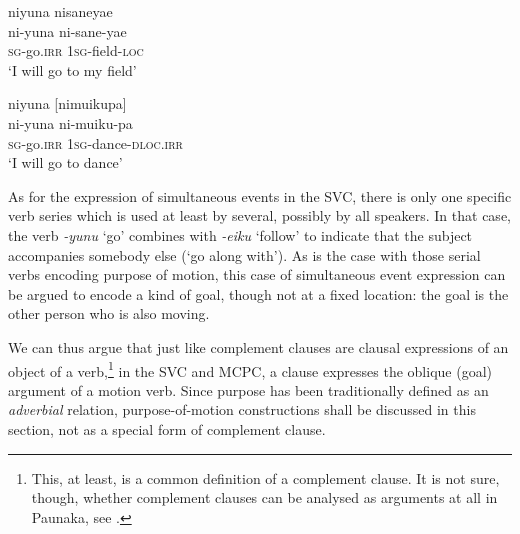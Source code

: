 \ea\label{ex:go-field}
\begingl
\glpreamble niyuna nisaneyae\\
\gla ni-yuna ni-sane-yae\\
\textsc{sg}-go.\textsc{irr} 1\textsc{sg}-field-\textsc{loc}\\
\glft ‘I will go to my field’
\endgl
\trailingcitation{[jxx-n101013s-1.652]}
\xe

\ea\label{ex:go-dance}
\begingl
\glpreamble niyuna \textup{[}nimuikupa\textup{]}\\
\gla ni-yuna ni-muiku-pa\\
\textsc{sg}-go.\textsc{irr} 1\textsc{sg}-dance-\textsc{dloc.irr}\\
\glft ‘I will go to dance’
\endgl
\trailingcitation{[rxx-e181022le]}
\xe


As for the expression of simultaneous events in the SVC, there is only one specific verb series which is used at least by several, possibly by all speakers. In that case, the verb \textit{-yunu} ‘go’ combines with \textit{-eiku} ‘follow’ to indicate that the subject accompanies somebody else (‘go along with’). As is the case with those serial verbs encoding purpose of motion, this case of simultaneous event expression can be argued to encode a kind of goal, though not at a fixed location: the goal is the other person who is also moving.

We can thus argue that just like complement clauses are clausal expressions of an object of a verb,\footnote{This, at least, is a common definition of a complement clause. It is not sure, though, whether complement clauses can be analysed as arguments at all in Paunaka, see .} in the SVC and MCPC, a clause expresses the oblique (goal) argument of a motion verb. Since purpose has been traditionally defined as an \textit{adverbial} relation, purpose-of-motion constructions shall be discussed in this section, not as a special form of complement clause.


